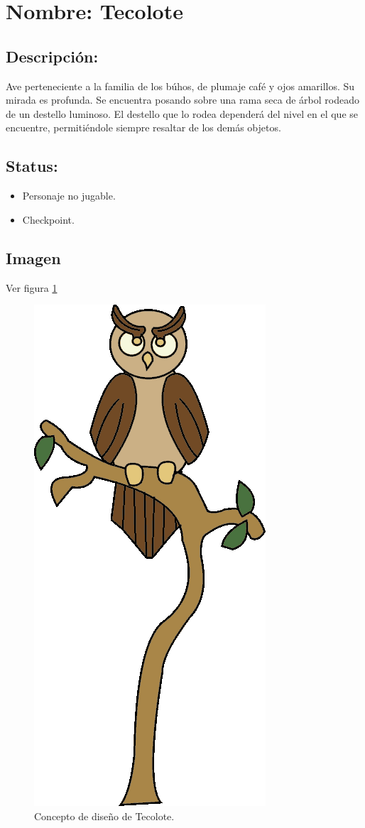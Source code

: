 \section{Nombre: Tecolote}   \label{per:tecolote}
\subsection{Descripción:}
Ave perteneciente a la familia de los búhos, de plumaje café y ojos amarillos. Su mirada es profunda. Se encuentra posando sobre una rama seca de árbol rodeado de un destello luminoso. El destello que lo rodea dependerá del nivel en el que se encuentre, permitiéndole siempre resaltar de los demás objetos.
\subsection{Status:}
	\begin{itemize}
		\item Personaje no jugable.
		\item Checkpoint.
	\end{itemize}
\subsection{Imagen}
Ver figura \ref{fig:TecoloteDiseno}
	\begin{figure}
					\centering
					\includegraphics[height=0.3 \textheight]{Imagenes/armas}
					\caption{Concepto de diseño de Tecolote.}
					\label{fig:TecoloteDiseno}
	\end{figure}
